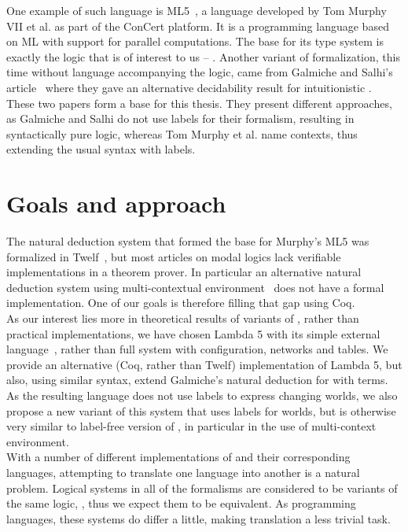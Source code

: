 One example of such language is ML5~\cite{ml5}, a language developed by Tom Murphy VII et al. as part of the ConCert platform. It is a programming language based on ML with support for parallel computations. The base for its type system is exactly the logic that is of interest to us -- \logic{}.  Another variant of \logic{} formalization, this time without language accompanying the logic, came from Galmiche and Salhi's article~\cite{labelfree} where they gave an alternative decidability result for intuitionistic \logicSfive{}. These two papers form a base for this thesis. They present different approaches, as Galmiche and Salhi do not use labels for their formalism, resulting in syntactically pure logic, whereas Tom Murphy et al. name contexts, thus extending the usual syntax with labels.

\section{Goals and approach}
The natural deduction system that formed the base for Murphy's ML5 was formalized in Twelf~\cite{labeled}, but most articles on modal logics lack verifiable implementations in a theorem prover. In particular an alternative natural deduction system using multi-contextual environment~\cite{labelfree} does not have a formal implementation. One of our goals is therefore filling that gap using Coq.\\

As our interest lies more in theoretical results of variants of \logic{}, rather than practical implementations, we have chosen Lambda 5 with its simple external language~\cite{labeled}, rather than full system with configuration, networks and tables. We provide an alternative (Coq, rather than Twelf) implementation of Lambda 5, but also, using similar syntax, extend Galmiche's natural deduction for \lang{} with terms. As the resulting language does not use labels to express changing worlds, we also propose a new variant of this system that uses labels for worlds, but is otherwise very similar to label-free version of \logic{}, in particular in the use of multi-context environment.\\

With a number of different implementations of \logic{} and their corresponding languages, attempting to translate one language into another is a natural problem. Logical systems in all of the formalisms are considered to be variants of the same logic, \logic{}, thus we expect them to be equivalent. As programming languages, these systems do differ a little, making translation a less trivial task.

